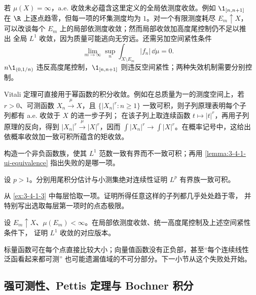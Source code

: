 \begin{remark}[无限空间上要把尖峰与逃逸分开]
若 $\mu(X)=\infty$，a.e. 收敛未必蕴含这里定义的全局依测度收敛。例如
$\1_{[n,n+1]}$ 在 $\R$ 上逐点趋零，但每一项的坏集测度均为 $1$。对一个有限测度耗尽
$E_m\uparrow X$，可以改谈每个 $E_m$ 上的局部依测度收敛；然而局部收敛加高度尾控制仍不足以推出
全局 $L^1$ 收敛，因为质量可能逃向无穷远。还需另加空间紧性条件
\[
 \lim_{m\to\infty}\sup_n\int_{X\setminus E_m}|f_n|\,\dd\mu=0.
\]
$n\1_{(0,1/n)}$ 违反高度尾控制，$\1_{[n,n+1]}$ 则违反空间紧性；两种失效机制需要分别控制。
\end{remark}

Vitali 定理可直接用于幂函数的积分收敛。例如在总质量为一的测度空间上，若 $r>0$、可测函数
$X_n\xrightarrow{\mu}X$，且
$\{|X_n|^r:n\ge1\}$ 一致可积，则子列原理表明每个子列都有 a.e. 收敛于 $X$ 的进一步子列；
在该子列上取连续函数 $t\mapsto|t|^r$，再用子列原理的反向，得到
$|X_n|^r\xrightarrow{\mu}|X|^r$，因而
$\int|X_n|^r\to\int|X|^r$。在概率记号中，这给出依概率收敛加一致可积所蕴含的矩收敛。

\begin{exercise}[尖峰与一致 $L^1$ 界]\label{exercise:3-4-1-1}
构造一个非负函数族，使其 $L^1$ 范数一致有界而不一致可积；再用
\cref{lemma:3-4-1-ui-equivalence} 指出失败的是哪一项。
\end{exercise}
\begin{exercise}[$L^p$ 控制]\label{exercise:3-4-1-2}
设 $p>1$。分别用尾积分估计与小测集绝对连续性证明 $L^p$ 有界族一致可积。
\end{exercise}
\begin{exercise}[打字机子列]\label{exercise:3-4-1-3}
从 \cref{ex:3-4-1-3} 中每层恰取一项。证明所得任意这样的子列都几乎处处趋于零，
并特别写出选取每层第一项时的点态极限。
\end{exercise}
\begin{exercise}[局部 Vitali]\label{exercise:3-4-1-4}
设 $E_m\uparrow X$、$\mu(E_m)<\infty$。在局部依测度收敛、统一高度尾控制及上述空间紧性条件下，
证明 $L^1$ 收敛的对应版本。
\end{exercise}

标量函数可在每个点直接比较大小；向量值函数没有正负部，甚至“每个连续线性泛函看起来都可测”
也可能遗漏值域的不可分部分。下一小节从这个失败处开始。


\subsection{强可测性、Pettis 定理与 Bochner 积分}\label{subsec:3-4-2}

